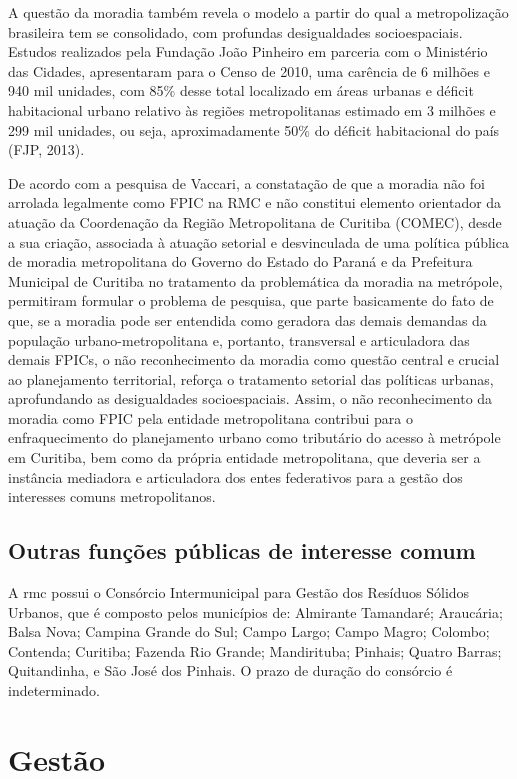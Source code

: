 	A questão da moradia também revela o modelo a partir do qual a metropolização brasileira tem se consolidado, com profundas desigualdades socioespaciais. Estudos realizados pela Fundação João Pinheiro em parceria com o Ministério das Cidades, apresentaram para o Censo de 2010, uma carência de 6 milhões e 940 mil unidades, com 85\% desse total localizado em áreas urbanas e déficit habitacional urbano relativo às regiões metropolitanas estimado em 3 milhões e 299 mil unidades, ou seja, aproximadamente 50\% do déficit habitacional do país (FJP, 2013).
	
	De acordo com a pesquisa de Vaccari, a constatação de que a moradia não foi arrolada legalmente como FPIC na RMC e não constitui elemento orientador da atuação da Coordenação da Região Metropolitana de Curitiba (COMEC), desde a sua criação, associada à atuação setorial e desvinculada de uma política pública de moradia metropolitana do Governo do Estado do Paraná e da Prefeitura Municipal de Curitiba no tratamento da problemática da moradia na metrópole, permitiram formular o problema de pesquisa, que parte basicamente do fato de que, se a moradia pode ser entendida como geradora das demais demandas da população urbano-metropolitana e, portanto, transversal e articuladora das demais FPICs, o não reconhecimento da moradia como questão central e crucial ao planejamento territorial, reforça o tratamento setorial das políticas urbanas, aprofundando as desigualdades socioespaciais. Assim, o não reconhecimento da moradia como FPIC pela entidade metropolitana contribui para o enfraquecimento do planejamento urbano como tributário do acesso à metrópole em Curitiba, bem como da própria entidade metropolitana, que deveria ser a instância mediadora e articuladora dos entes federativos para a gestão dos interesses comuns metropolitanos.
	
	\section{Outras funções públicas de interesse comum}
	
	A \gls{rmc} possui o Consórcio Intermunicipal para Gestão dos Resíduos Sólidos Urbanos, que é composto pelos municípios de: Almirante Tamandaré; Araucária; Balsa Nova; Campina Grande do Sul; Campo Largo; Campo Magro; Colombo; Contenda; Curitiba; Fazenda Rio Grande; Mandirituba; Pinhais; Quatro Barras; Quitandinha, e São José dos Pinhais. O prazo de duração do consórcio é indeterminado.
	
	\chapter{Gestão}
	
